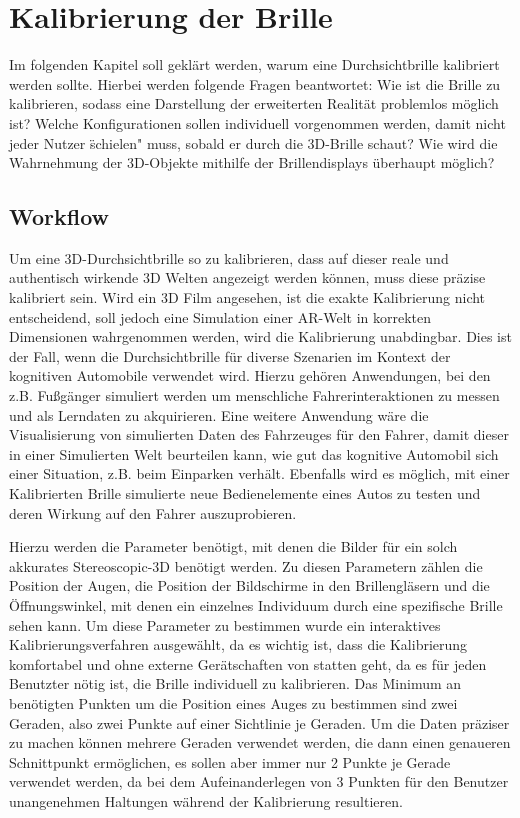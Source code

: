 \section{Kalibrierung der Brille}
Im folgenden Kapitel soll geklärt werden, warum eine Durchsichtbrille kalibriert werden sollte. Hierbei werden folgende Fragen beantwortet: Wie ist die Brille zu kalibrieren, sodass eine Darstellung der erweiterten Realität problemlos möglich ist? Welche Konfigurationen sollen individuell vorgenommen werden, damit nicht jeder Nutzer \" schielen" muss, sobald er durch die 3D-Brille schaut? Wie wird die Wahrnehmung der 3D-Objekte mithilfe der Brillendisplays überhaupt möglich?

\subsection{Workflow}
Um eine 3D-Durchsichtbrille so zu kalibrieren, dass auf dieser reale und authentisch wirkende 3D Welten angezeigt werden können, muss diese präzise kalibriert sein. Wird ein 3D Film angesehen, ist die exakte Kalibrierung nicht entscheidend, soll jedoch eine Simulation einer AR-Welt in korrekten Dimensionen wahrgenommen werden, wird die Kalibrierung unabdingbar. Dies ist der Fall, wenn die Durchsichtbrille für diverse Szenarien im Kontext der kognitiven Automobile verwendet wird. Hierzu gehören Anwendungen, bei den z.B. Fußgänger simuliert werden um menschliche Fahrerinteraktionen zu messen und als Lerndaten zu akquirieren. Eine weitere Anwendung wäre die Visualisierung von simulierten Daten des Fahrzeuges für den Fahrer, damit dieser in einer Simulierten Welt beurteilen kann, wie gut das kognitive Automobil sich einer Situation, z.B. beim Einparken verhält. Ebenfalls wird es möglich, mit einer Kalibrierten Brille simulierte neue Bedienelemente eines Autos zu testen und deren Wirkung auf den Fahrer auszuprobieren.

Hierzu werden die Parameter benötigt, mit denen die Bilder für ein solch akkurates Stereoscopic-3D benötigt werden. Zu diesen Parametern zählen die Position der Augen, die Position der Bildschirme in den Brillengläsern und die Öffnungswinkel, mit denen ein einzelnes Individuum durch eine spezifische Brille sehen kann. Um diese Parameter zu bestimmen wurde ein interaktives Kalibrierungsverfahren ausgewählt, da es wichtig ist, dass die Kalibrierung komfortabel und ohne externe Gerätschaften von statten geht, da es für jeden Benutzter nötig ist, die Brille individuell zu kalibrieren. Das Minimum an benötigten Punkten um die Position eines Auges zu bestimmen sind zwei Geraden, also zwei Punkte auf einer Sichtlinie je Geraden. Um die Daten präziser zu machen können mehrere Geraden verwendet werden, die dann einen genaueren Schnittpunkt ermöglichen, es sollen aber immer nur 2 Punkte je Gerade verwendet werden, da bei dem Aufeinanderlegen von 3 Punkten für den Benutzer unangenehmen Haltungen während der Kalibrierung resultieren.

